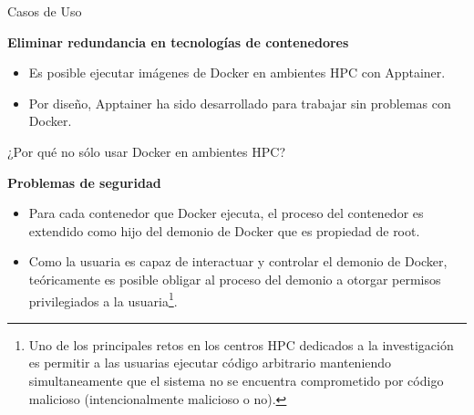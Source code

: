 \documentclass[11pt]{beamer}
\begin{document}
\begin{frame}{Casos de Uso}

\textbf{Eliminar redundancia en tecnologías de contenedores}

\begin{itemize}
	\item Es posible ejecutar imágenes de Docker en ambientes HPC con Apptainer.
	\item Por diseño, Apptainer ha sido desarrollado para trabajar sin problemas con Docker. 
\end{itemize}
\end{frame}

\begin{frame}{¿Por qué no sólo usar Docker en ambientes HPC?}

\begin{center}
	\textbf{Problemas de seguridad}
\end{center}

\begin{itemize}
	\item Para cada contenedor que Docker ejecuta, el proceso del contenedor es extendido como hijo del demonio de Docker que es propiedad de root. 
	\item Como la usuaria es capaz de interactuar y controlar el demonio de Docker, teóricamente es posible obligar al proceso del demonio a otorgar permisos privilegiados a la usuaria\footnote{ Uno de los principales retos en los centros HPC dedicados a la investigación es permitir a las usuarias ejecutar código arbitrario manteniendo simultaneamente que el sistema no se encuentra comprometido por código malicioso (intencionalmente malicioso o no).}.
\end{itemize}

\end{frame}
\end{document}
